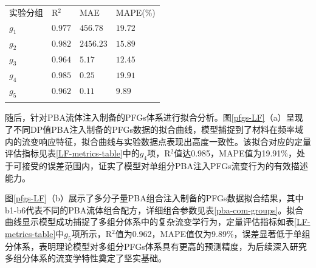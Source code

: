 \begin{table}
  \centering
  \small
  \begin{tabularx}{\textwidth}{>{\centering\arraybackslash}X >{\centering\arraybackslash}X >{\centering\arraybackslash}X >{\centering\arraybackslash}X} %
    \Xhline{1.5pt}
    实验分组  & R$^2$   & MAE       & MAPE(\%)                \tabularnewline
    \Xhline{0.5pt}  %
    $g_1$ & $0.977$ & $456.78$  & $19.72$ \tabularnewline
    $g_2$ & $0.982$ & $2456.23$ & $15.89 $ \tabularnewline
    $g_3$ & $0.964$ & $5.17$    & $12.45$ \tabularnewline
    $g_4$ & $0.985$ & $0.25$    & $19.91$\tabularnewline
    $g_5$ & $0.962$ & $0.11$    & $9.89$\tabularnewline
    \Xhline{1.5pt}
  \end{tabularx}
\end{table}

随后，针对PBA流体注入制备的PFGs体系进行拟合分析。图\ref{pfgs-LF}（a）呈现了不同DP值PBA注入制备的PFGs数据的拟合曲线，模型捕捉到了材料在频率域内的流变响应特征，拟合曲线与实验数据点表现出高度一致性。该拟合对应的定量评估指标见表\ref{LF-metrics-table}中的$g_4$项，R$^2$值达0.985，MAPE值为19.91\%，处于可接受的误差范围内，证实了模型对单组分PBA注入PFGs流变行为的有效描述能力。

图\ref{pfgs-LF}（b）展示了多分子量PBA组合注入制备的PFGs数据拟合结果，其中b1-b6代表不同的PBA流体组合配方，详细组合参数见表\ref{pba-com-groups}。拟合曲线显示模型成功捕捉了多组分体系中的复杂流变学行为，定量评估指标如表\ref{LF-metrics-table}中$g_5$项所示，R$^2$值为0.962，MAPE值仅为9.89\%，误差显著低于单组分体系，表明理论模型对多组分PFGs体系具有更高的预测精度，为后续深入研究多组分体系的流变学特性奠定了坚实基础。


